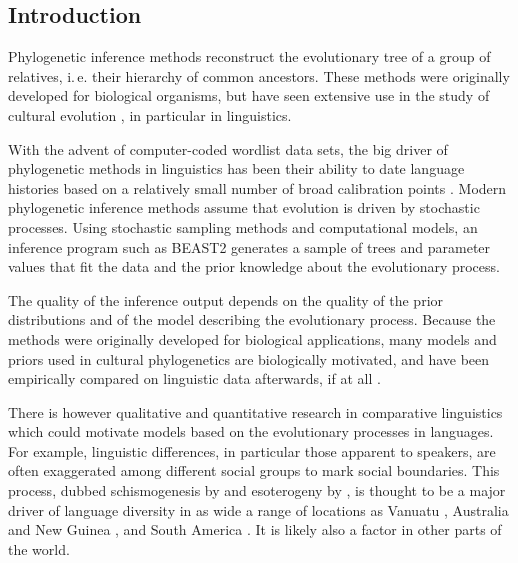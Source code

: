 \documentclass[]{rsos}%
\begin{document}
\begin{fmtext}
\section{Introduction}
\setlength{\emergencystretch}{1em}Phylogenetic inference methods reconstruct the e\-volu\-tion\-ary tree of a group of
relatives, i.\,e. their hierarchy of common ancestors.
These methods were originally developed for biological organisms, but have seen extensive
use in the study of cultural evolution \parencite{evans2021uses}, in particular in
linguistics.
\end{fmtext}
\maketitle
With the advent of computer-coded wordlist data sets, the big driver of
phylogenetic methods in linguistics has been their ability to date language
histories based on a relatively small number of broad calibration points
\parencite{borchsenius2017phylogenetics}.
Modern phylogenetic inference methods assume that evolution is driven by
stochastic processes. Using stochastic sampling methods and computational models,
an inference program such as BEAST2 \parencite{drummond2015bayesian}
generates a sample of trees and parameter values that fit the data and the prior knowledge
about the evolutionary process.

The quality of the inference output depends on the quality of the prior
distributions and of the model describing the evolutionary process. Because the
methods were originally developed for biological applications, many models and
priors used in cultural phylogenetics are biologically motivated, and have been
empirically compared on linguistic data afterwards, if at all
\parencite{kaiping2021systematic,rama2018three}.

There is however qualitative and quantitative research in comparative
linguistics which could motivate models based on the evolutionary processes in
languages. For example, linguistic differences, in particular those apparent to
speakers, are often exaggerated among different social groups to mark social
boundaries. This process, dubbed schismogenesis by \textcite{bateson1935culture}
and esoterogeny by \textcite{thurston1987processes}, is thought to be a major
driver of language diversity in as wide a range of locations as Vanuatu
\parencite{francois2011social}, Australia and New Guinea
\parencite{evans2019linguistic}, and South America
\parencite{epps2020amazonian}. It is likely also a factor in other parts of the
world.
\end{document}
